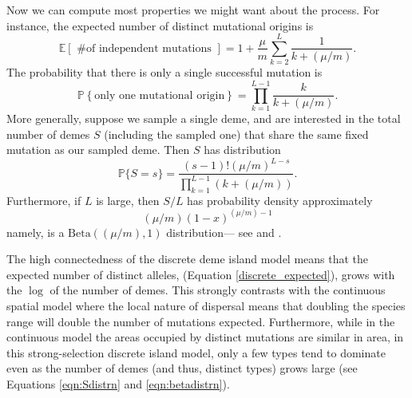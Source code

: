 \documentclass{article}
\renewcommand{\P}{\mathbb{P}}
\newcommand{\E}{\mathbb{E}}
\begin{document}
Now we can compute most properties we might want about the process.
For instance, the expected number of distinct mutational origins is
\begin{equation}
    \E\left[ \mbox{ \# of independent mutations } \right] = 
            1 + \frac{\mu}{m} \sum_{k=2}^L \frac{1}{k+(\mu/m)}. \label{discrete_expected}
\end{equation}
The probability that there is only a single successful mutation is
\begin{equation}
\P \left\{ \mbox{only one mutational origin} \right\} = 
            \prod_{k=1}^{L-1} \frac{ k }{ k+(\mu/m)} .
\end{equation}
More generally, suppose we sample a single deme, and are interested in the total number of demes $S$
(including the sampled one) that share the same fixed mutation as our sampled deme.
Then $S$ has distribution
\begin{equation} \label{eqn:Sdistrn}
\P\{ S=s \} = \frac{ (s-1)! (\mu/m)^{L-s} }{ \prod_{k=1}^{L-1} (k+(\mu/m)) } .
\end{equation}
Furthermore, if $L$ is large, then $S/L$ has probability density approximately
\begin{equation} \label{eqn:betadistrn}
   (\mu/m) (1-x)^{(\mu/m)-1}
\end{equation}
namely, is a $\mathrm{Beta}((\mu/m), 1)$ distribution--- see \cite{donnelly-joyce} and \cite{permanPitmanYor92}.


The high connectedness of the discrete deme island model means that the expected number of distinct alleles, (Equation \eqref{discrete_expected}), 
grows with the $\log$ of the number of demes. This strongly contrasts with the continuous spatial model where the local nature of dispersal means that doubling the species range will double the number of mutations expected. 
Furthermore, while in the continuous model the areas occupied by distinct mutations are similar in area, in this strong-selection discrete island model, 
only a few types tend to dominate even as the number of demes (and thus, distinct types) grows large (see Equations \eqref{eqn:Sdistrn} and \eqref{eqn:betadistrn}).
\end{document}
